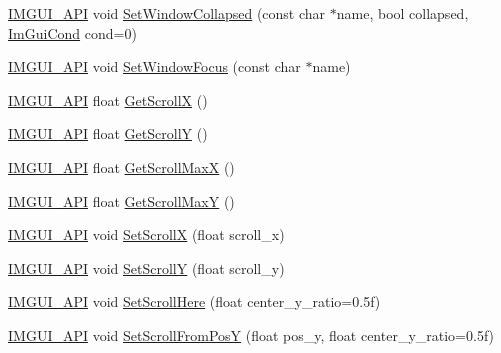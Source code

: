 \begin{DoxyCompactItemize}
\item 
\mbox{\hyperlink{imgui_8h_a43829975e84e45d1149597467a14bbf5}{I\+M\+G\+U\+I\+\_\+\+A\+PI}} void \mbox{\hyperlink{namespace_im_gui_ac349187d6aae141cd3b4476e54bcc338}{Set\+Window\+Collapsed}} (const char $\ast$name, bool collapsed, \mbox{\hyperlink{imgui_8h_aef890d6ac872e12c5804d0b3e4f7f103}{Im\+Gui\+Cond}} cond=0)
\item 
\mbox{\hyperlink{imgui_8h_a43829975e84e45d1149597467a14bbf5}{I\+M\+G\+U\+I\+\_\+\+A\+PI}} void \mbox{\hyperlink{namespace_im_gui_aa612adbb975051090898f094a1608f24}{Set\+Window\+Focus}} (const char $\ast$name)
\item 
\mbox{\hyperlink{imgui_8h_a43829975e84e45d1149597467a14bbf5}{I\+M\+G\+U\+I\+\_\+\+A\+PI}} float \mbox{\hyperlink{namespace_im_gui_a6f88335d87da3be81dc6e24cb1812923}{Get\+ScrollX}} ()
\item 
\mbox{\hyperlink{imgui_8h_a43829975e84e45d1149597467a14bbf5}{I\+M\+G\+U\+I\+\_\+\+A\+PI}} float \mbox{\hyperlink{namespace_im_gui_a3c924a2eeb8b2ddfb40ea17be7ea12a6}{Get\+ScrollY}} ()
\item 
\mbox{\hyperlink{imgui_8h_a43829975e84e45d1149597467a14bbf5}{I\+M\+G\+U\+I\+\_\+\+A\+PI}} float \mbox{\hyperlink{namespace_im_gui_af472cb090157c22e65a0aa1662b9f3d0}{Get\+Scroll\+MaxX}} ()
\item 
\mbox{\hyperlink{imgui_8h_a43829975e84e45d1149597467a14bbf5}{I\+M\+G\+U\+I\+\_\+\+A\+PI}} float \mbox{\hyperlink{namespace_im_gui_ab34c0d5c63908a7ff50923151730f76a}{Get\+Scroll\+MaxY}} ()
\item 
\mbox{\hyperlink{imgui_8h_a43829975e84e45d1149597467a14bbf5}{I\+M\+G\+U\+I\+\_\+\+A\+PI}} void \mbox{\hyperlink{namespace_im_gui_a0796750de8c50555d895f63e79ac87f0}{Set\+ScrollX}} (float scroll\+\_\+x)
\item 
\mbox{\hyperlink{imgui_8h_a43829975e84e45d1149597467a14bbf5}{I\+M\+G\+U\+I\+\_\+\+A\+PI}} void \mbox{\hyperlink{namespace_im_gui_a41833555962807384432e6fc94d46ec9}{Set\+ScrollY}} (float scroll\+\_\+y)
\item 
\mbox{\hyperlink{imgui_8h_a43829975e84e45d1149597467a14bbf5}{I\+M\+G\+U\+I\+\_\+\+A\+PI}} void \mbox{\hyperlink{namespace_im_gui_aa60ea4a42b8d03d27431f8e79b9f0254}{Set\+Scroll\+Here}} (float center\+\_\+y\+\_\+ratio=0.\+5f)
\item 
\mbox{\hyperlink{imgui_8h_a43829975e84e45d1149597467a14bbf5}{I\+M\+G\+U\+I\+\_\+\+A\+PI}} void \mbox{\hyperlink{namespace_im_gui_a57d8e9497ad39584ba740cef70b78fb4}{Set\+Scroll\+From\+PosY}} (float pos\+\_\+y, float center\+\_\+y\+\_\+ratio=0.\+5f)

\end{DoxyCompactItemize}
